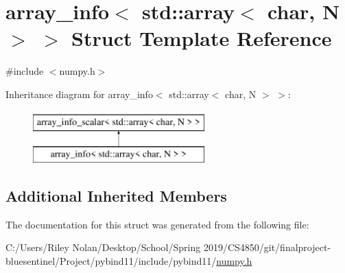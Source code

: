 \hypertarget{structarray__info_3_01std_1_1array_3_01char_00_01_n_01_4_01_4}{}\section{array\+\_\+info$<$ std\+::array$<$ char, N $>$ $>$ Struct Template Reference}
\label{structarray__info_3_01std_1_1array_3_01char_00_01_n_01_4_01_4}


{\ttfamily \#include $<$numpy.\+h$>$}

Inheritance diagram for array\+\_\+info$<$ std\+::array$<$ char, N $>$ $>$\+:\begin{figure}[H]
\begin{center}
\leavevmode
\includegraphics[height=2.000000cm]{structarray__info_3_01std_1_1array_3_01char_00_01_n_01_4_01_4}
\end{center}
\end{figure}
\subsection*{Additional Inherited Members}


The documentation for this struct was generated from the following file\+:\begin{DoxyCompactItemize}
\item 
C\+:/\+Users/\+Riley Nolan/\+Desktop/\+School/\+Spring 2019/\+C\+S4850/git/finalproject-\/bluesentinel/\+Project/pybind11/include/pybind11/\mbox{\hyperlink{numpy_8h}{numpy.\+h}}\end{DoxyCompactItemize}
